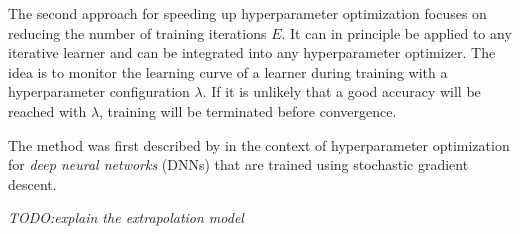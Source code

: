 The second approach for speeding up hyperparameter optimization focuses on reducing the number of training iterations \(E\).
It can in principle be applied to any iterative learner and can be integrated into any hyperparameter optimizer.
The idea is to monitor the learning curve of a learner during training with a hyperparameter configuration \(\lambda\).
If it is unlikely that a good accuracy will be reached with \(\lambda\), training will be terminated before convergence.

The method was first described by \citet{Domhan2015} in the context of hyperparameter optimization for \textit{deep neural networks} (DNNs) that are trained using stochastic gradient descent.

\textit{TODO:\@ explain the extrapolation model}
